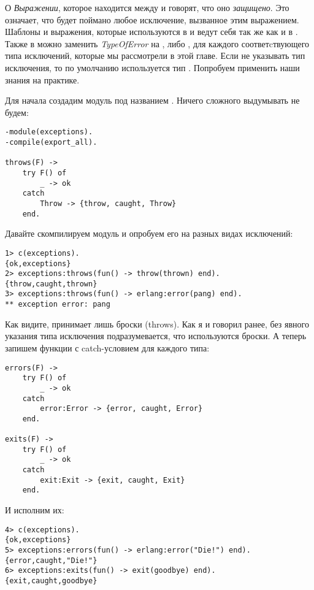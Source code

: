 О \emph{Выражении}, которое находится между  и  говорят, что оно \emph{защищено}. Это означает, что будет поймано любое исключение, вызванное этим выражением.
Шаблоны и выражения, которые используются в  и  ведут себя так же как и в .
Также в  можно заменить \emph{TypeOfError} на ,  либо , для каждого соответcтвующего типа исключений, которые мы рассмотрели в этой главе.
Если не указывать тип исключения, то по умолчанию используется тип .
Попробуем применить наши знания на практике.

Для начала создадим модуль под названием .
Ничего сложного выдумывать не будем:
\begin{lstlisting}[style=erlang]
-module(exceptions).
-compile(export_all).
 
throws(F) ->
    try F() of
        _ -> ok
    catch
        Throw -> {throw, caught, Throw}
    end.
\end{lstlisting}

Давайте скомпилируем модуль и опробуем его на разных видах исключений:
\begin{lstlisting}[style=erlang]
1> c(exceptions).
{ok,exceptions}
2> exceptions:throws(fun() -> throw(thrown) end).
{throw,caught,thrown}
3> exceptions:throws(fun() -> erlang:error(pang) end).
** exception error: pang
\end{lstlisting}

Как видите,  принимает лишь броски (throws).
Как я и говорил ранее, без явного указания типа исключения подразумевается, что используются броски.
А теперь запишем функции с catch\--условием для каждого типа:
\begin{lstlisting}[style=erlang]
errors(F) ->
    try F() of
        _ -> ok
    catch
        error:Error -> {error, caught, Error}
    end.
 
exits(F) ->
    try F() of
        _ -> ok
    catch
        exit:Exit -> {exit, caught, Exit}
    end.
\end{lstlisting}

И исполним их:
\begin{lstlisting}[style=erlang]
4> c(exceptions).
{ok,exceptions}
5> exceptions:errors(fun() -> erlang:error("Die!") end).
{error,caught,"Die!"}
6> exceptions:exits(fun() -> exit(goodbye) end).
{exit,caught,goodbye}
\end{lstlisting}

